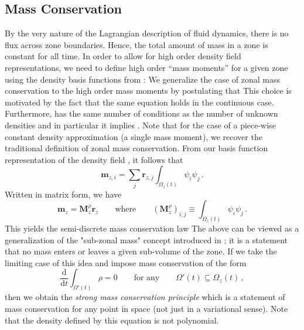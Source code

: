 \subsection{Mass Conservation} \label{sec:densityupdateeq}
By the very nature of the Lagrangian description of fluid dynamics, there is no flux across zone boundaries. Hence, the total amount of mass in a zone is constant for all time. 
In order to allow for high order density field representations, we need to define high order ``mass moments'' for a given zone using the density basis functions from :
We generalize the case of zonal mass conservation to the high order
mass moments by postulating that
This choice is motivated by the fact that the same equation holds in the
continuous case. Furthermore,  has the same number of
conditions as the number of unknown densities and in particular it implies
.
Note that for the case of a piece-wise constant density approximation
(a single mass moment), we recover the traditional definition of
zonal mass conservation. From our basis function representation of the density field , it follows that
$$
  \mathbf{m}_{z,i}=\sum_j \mathbf{r}_{z,j}\int_{\Omega_z(t)}\psi_i\psi_j \, .
$$
Written in matrix form, we have 
$$
  \mathbf{m}_z = \mathbf{M}^{\rho}_z \mathbf{r}_z
  \qquad\text{where}\qquad
  (\mathbf{M}^{\rho}_z)_{i,j} \equiv \int_{\Omega _z(t)} \psi_i \psi_j \,.
$$
This yields the semi-discrete mass conservation law
The above can be viewed as a generalization of the "sub-zonal mass" concept
introduced in  \cite{CaramanaBurtonShashkov98}; it is a statement that
no mass enters or leaves a given sub-volume of the zone.
If we take the limiting case of this idea and impose mass conservation of the
form
$$
  \frac{\mathrm{d} }{\mathrm{d}t} \int_{\Omega'(t)} \rho = 0 \qquad \mbox {for any} \qquad
\Omega'(t) \subseteq \Omega_z(t) \,,
$$
then we obtain the \emph{strong mass conservation principle}\label{sec:strongmass}
which is a statement of mass conservation for any point in space (not just in
a variational sense). Note that the density defined by this equation is not
polynomial.

